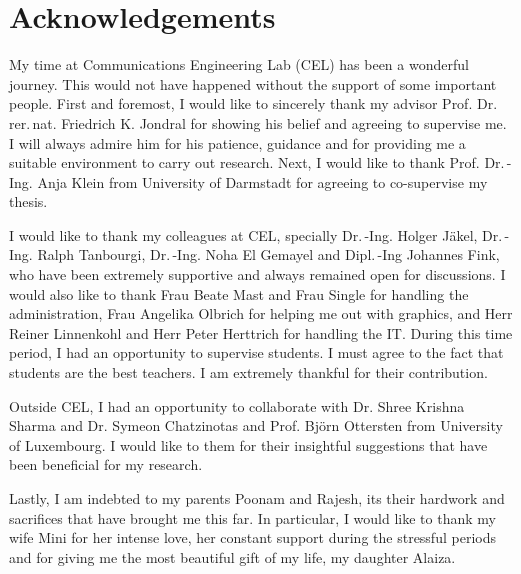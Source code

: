 \chapter*{Acknowledgements}

My time at Communications Engineering Lab (CEL) has been a wonderful journey. This would not have happened without the support of some important people. First and foremost, I would like to sincerely thank my advisor Prof. Dr.\,rer.\,nat. Friedrich K. Jondral for showing his belief and agreeing to supervise me. %
I will always admire him for his patience, guidance and for providing me a suitable environment to carry out research. Next, I would like to thank Prof. Dr.\,-Ing. Anja Klein from University of Darmstadt for agreeing to co-supervise my thesis.

I would like to thank my colleagues at CEL, specially Dr.\,-Ing. Holger J\"akel, Dr.\,-Ing. Ralph Tanbourgi, Dr.\,-Ing. Noha El Gemayel and Dipl.\,-Ing Johannes Fink, who have been extremely supportive and always remained open for discussions. I would also like to thank Frau Beate Mast and Frau Single for handling the administration, Frau Angelika Olbrich for helping me out with graphics, and Herr Reiner Linnenkohl and Herr Peter Herttrich for handling the IT. During this time period, I had an opportunity to supervise students. I must agree to the fact that students are the best teachers. I am extremely thankful for their contribution. 

Outside CEL, I had an opportunity to collaborate with Dr. Shree Krishna Sharma and Dr. Symeon Chatzinotas and Prof. Bj\"orn Ottersten from University of Luxembourg. I would like to them for their insightful suggestions that have been beneficial for my research.

Lastly, I am indebted to my parents Poonam and Rajesh, its their hardwork and sacrifices that have brought me this far. In particular, I would like to thank my wife Mini for her intense love, her constant support during the stressful periods and for giving me the most beautiful gift of my life, my daughter Alaiza. 
